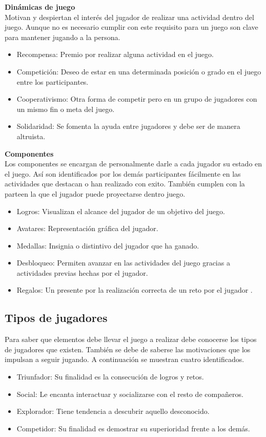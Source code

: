 \textbf{Dinámicas de juego}
\\[1pt]
Motivan y despiertan el interés del jugador de realizar una actividad dentro del juego. Aunque no es necesario cumplir con este requisito para un juego son clave para mantener jugando a la persona.  

\begin{itemize}
	\item Recompensa: Premio por realizar alguna actividad en el juego.
	\item Competición: Deseo de estar en una determinada posición o grado en el juego entre los participantes.
	\item Cooperativismo: Otra forma de competir pero en un grupo de jugadores con un mismo fin o meta del juego.
	\item Solidaridad: Se fomenta la ayuda entre jugadores y debe ser de manera altruista.
\end{itemize}

\textbf{Componentes}
\\[1pt]
Los componentes se encargan de personalmente darle a cada jugador su estado en el juego. Así son identificados por los demás participantes fácilmente en las actividades que destacan o han realizado con exito. También cumplen con la parteen la que el jugador puede proyectarse dentro juego.
\begin{itemize}
	\item Logros: Visualizan el alcance del jugador de un objetivo del juego.
	\item Avatares: Representación gráfica del jugador.
	\item Medallas: Insignia o distintivo del jugador que ha ganado.
	\item Desbloqueo: Permiten avanzar en las actividades del juego gracias a actividades previas hechas por el jugador.
	\item Regalos: Un presente por la realización correcta de un reto por el jugador	.
\end{itemize}

\subsection{Tipos de jugadores}
Para saber que elementos debe llevar el juego a realizar debe conocerse los tipos de jugadores que existen. También se debe de saberse las motivaciones que los impulsan a seguir jugando. A continuación se muestran cuatro identificados.
\begin{itemize}
	\item Triunfador: Su finalidad es la consecución de logros y retos.
	\item Social: Le encanta interactuar y socializarse con el resto de compañeros.
	\item Explorador: Tiene tendencia a descubrir aquello desconocido.
	\item Competidor: Su finalidad es demostrar su superioridad frente a los demás.
\end{itemize}


